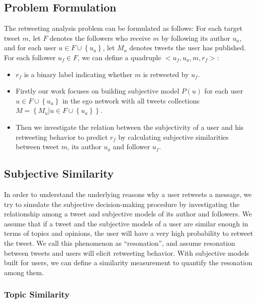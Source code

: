 \documentclass[letterpaper]{article}
\begin{document}
\subsection{Problem Formulation}
\label{formulation}

The retweeting analysis problem can be formulated as follows:
For each target tweet $ m $, let $ F $ denotes the followers who receive $ m $ by following its author $ u_{a} $, and for each user $ u \in F \cup \left\lbrace u_{a} \right\rbrace  $, let $ M_{u} $ denotes   tweets the user has published. 
For each follower $ u_{f} \in F $, we can define a quadruple $ <u_{f}, u_{a}, m, r_{f}>  $: 
\begin{itemize}
\item $ r_{f} $ is a binary label indicating whether $ m $ is retweeted by $ u_{f} $.
\item Firstly our work focuses on building subjective model $ P\left( u \right)  $ for each user $ u \in F \cup \left\lbrace u_{a} \right\rbrace $ in the ego network with all tweets collections $ M=\left\lbrace M_{u} | u \in F \cup \left\lbrace u_{a} \right\rbrace  \right\rbrace  $.
\item Then we investigate the relation between the subjectivity of a user and his retweeting behavior to predict $ r_{f} $ by calculating subjective similarities between tweet $ m $, its author $ u_{a} $ and follower $ u_{f} $. 
\end{itemize}

\subsection{Subjective Similarity}
\label{similarity}

In order to understand the underlying reasons why a user retweets a message, we try to simulate the subjective decision-making procedure by investigating the relationship among a tweet and subjective models of its author and followers. 
We assume that if a tweet and the subjective models of a user are similar enough in terms of topics and opinions, the user will have a very high probability to retweet the tweet. 
We call this phenomenon as ``resonation'', and assume resonation between tweets and users will elicit retweeting behavior.
With subjective models built for users, we can define a similarity measurement to quantify the resonation among them.

\subsubsection{Topic Similarity}
\label{topsim}
\end{document}
